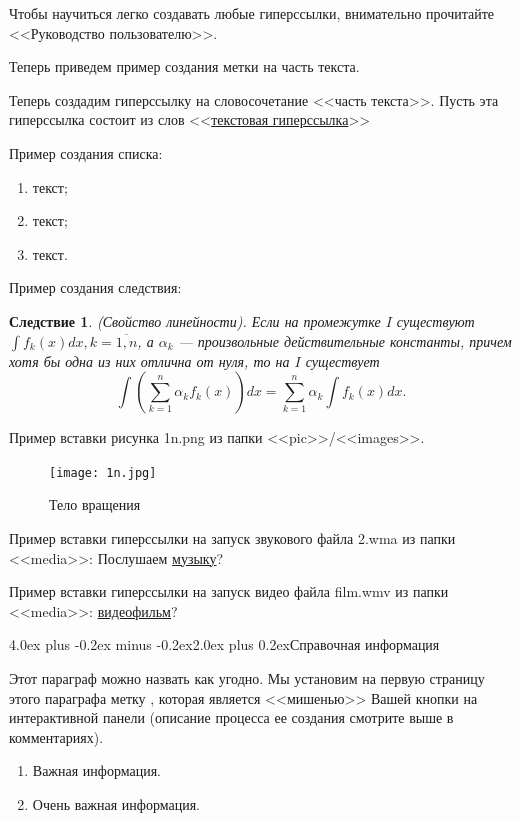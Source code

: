 \documentclass[12pt, a4paper]{book}%
\makeatletter
\renewcommand{\section}{\@startsection{section}{1}{1pt}%
{4.0ex plus -0.2ex minus -0.2ex}{2.0ex plus 0.2ex}{\centering\bf}}%
\newtheorem{corollary}{\indent \color{red}Следствие}[chapter]
\makeatother
\begin{document}
{Чтобы научиться легко создавать любые гиперссылки, внимательно прочитайте <<Руководство
пользователю>>.

Теперь приведем пример создания метки {\color{green}\hypertarget{metkatext}{на часть текста}}.

Теперь создадим гиперссылку на словосочетание <<часть текста>>. Пусть эта гиперссылка
состоит из слов <<\hyperlink{metkatext}{текстовая гиперссылка}>>

Пример создания списка:
\begin{enumerate}
\item текст;
\item текст;
\item текст.
\end{enumerate}

Пример создания следствия:
\begin{corollary}{\rm(Свойство линейности)}. Если на промежутке $I$ существуют $\int
f_k(x)dx, k=\overline{1,n}$, а $\alpha_k$ --- произвольные
действительные константы, причем хотя бы одна из них отлична от
нуля, то на $I$ существует $$\int\left(\sum_{k=1}^n \alpha_k
f_k(x)\right)dx=\sum_{k=1}^n \alpha_k
\int{f_k(x)dx}.$$\end{corollary}

Пример вставки рисунка 1n.png из папки <<pic>>/<<images>>.
\begin{figure}[h!]\center
  \texttt{[image: 1n.jpg]}
   \caption{Тело вращения}\label{ris1}
\end{figure}

Пример вставки гиперссылки на запуск звукового файла 2.wma из папки <<media>>:
Послушаем \href{run:media/2.wma}{музыку}?

Пример вставки гиперссылки на запуск видео файла film.wmv из папки <<media>>:
\href{run:media/film.avi}{видеофильм}?

\section{Справочная информация}

Этот параграф можно назвать как угодно. Мы установим на первую страницу этого параграфа
метку \label{mybutton}, которая является <<мишенью>> Вашей кнопки на интерактивной панели
(описание процесса ее создания смотрите выше в комментариях).
\begin{enumerate}%
\item Важная информация.
\item Очень важная информация.
\end{enumerate}%

}
\end{document}
